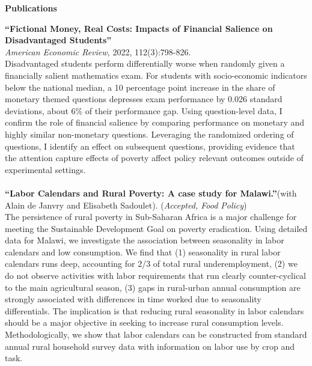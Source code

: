 \documentclass[10pt, oneside]{article}
\begin{document}
\begin{minipage}[t]{0.1\linewidth}
\textbf{Publications}
\end{minipage}\hspace{0.05\linewidth}
\begin{minipage}[t]{0.8\linewidth}

\textbf{``Fictional Money, Real Costs: Impacts of Financial Salience on Disadvantaged Students''}\\ \emph{ American Economic Review,} 2022, 112(3):798-826. \href{http://claireduq.github.io/FMRC_Duquennois.pdf}{\color{blue}{Available here}}\\
Disadvantaged students perform differentially worse when randomly given a financially salient mathematics exam. For students with socio-economic indicators below the national median, a 10 percentage point increase in the share of monetary themed questions depresses exam performance by 0.026 standard deviations, about 6\% of their performance gap. Using question-level data, I confirm the role of financial salience by comparing performance on monetary and highly similar non-monetary questions. Leveraging the randomized ordering of questions, I identify an effect on subsequent questions, providing evidence that the attention capture effects of poverty affect policy relevant outcomes outside of experimental settings. \\~\\

\textbf{``Labor Calendars and Rural Poverty: A case study for Malawi.''}(with Alain de Janvry and Elisabeth Sadoulet). (\emph{Accepted, Food Policy})  \href{http://claireduq.github.io/laborcal_FP_revision_adj.pdf}{\color{blue}{Available here}}\\
The persistence of rural poverty in Sub-Saharan Africa is a major challenge for meeting the Sustainable Development Goal on poverty eradication. Using detailed data for Malawi, we investigate the association between seasonality in labor calendars and low consumption. We find that (1) seasonality in rural labor calendars runs deep, accounting for 2/3 of total rural underemployment, (2) we do not observe activities with labor requirements that run clearly counter-cyclical to the main agricultural season, (3) gaps in rural-urban annual consumption are strongly associated with differences in time worked due to seasonality differentials. The implication is that reducing rural seasonality in labor calendars should be a major objective in seeking to increase rural consumption levels. Methodologically, we show that labor calendars can be constructed from standard annual rural household survey data with information on labor use by crop and task.\\~\\
\end{minipage}\vspace{4mm}
\end{document}
